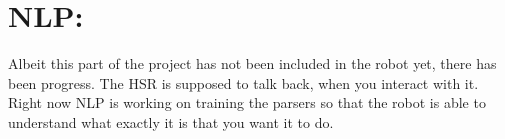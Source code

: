 \documentclass[main.tex]{subfiles}
\begin{document}
		\section{NLP:}
		Albeit this part of the project has not been included in the robot yet, there has been progress. The HSR is supposed to talk back, when you interact with it. Right now NLP is working on training the parsers so that the robot is able to understand what exactly it is that you want it to do. 
\end{document}
